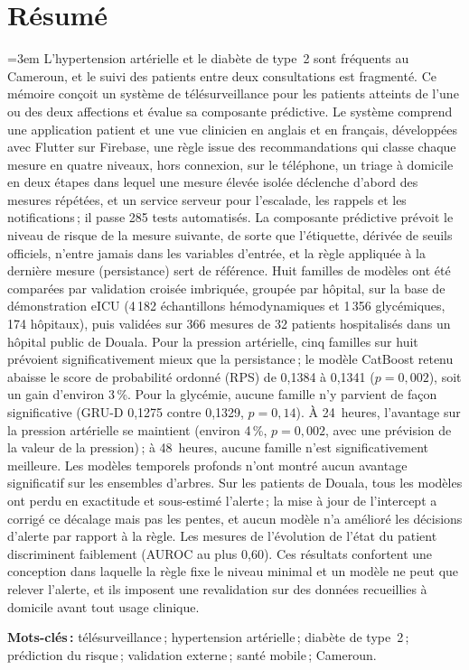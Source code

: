 \documentclass[11pt,a4paper,oneside]{report}
\begin{document}
\chapter*{Résumé}
{\emergencystretch=3em
L'hypertension artérielle et le diabète de type~2 sont fréquents au Cameroun, et le suivi des patients entre deux consultations est fragmenté. Ce mémoire conçoit un système de télésurveillance pour les patients atteints de l'une ou des deux affections et évalue sa composante prédictive. Le système comprend une application patient et une vue clinicien en anglais et en français, développées avec Flutter sur Firebase, une règle issue des recommandations qui classe chaque mesure en quatre niveaux, hors connexion, sur le téléphone, un triage à domicile en deux étapes dans lequel une mesure élevée isolée déclenche d'abord des mesures répétées, et un service serveur pour l'escalade, les rappels et les notifications\,; il passe 285 tests automatisés. La composante prédictive prévoit le niveau de risque de la mesure suivante, de sorte que l'étiquette, dérivée de seuils officiels, n'entre jamais dans les variables d'entrée, et la règle appliquée à la dernière mesure (persistance) sert de référence. Huit familles de modèles ont été comparées par validation croisée imbriquée, groupée par hôpital, sur la base de démonstration eICU (4\,182 échantillons hémodynamiques et 1\,356 glycémiques, 174 hôpitaux), puis validées sur 366 mesures de 32 patients hospitalisés dans un hôpital public de Douala. Pour la pression artérielle, cinq familles sur huit prévoient significativement mieux que la persistance\,; le modèle CatBoost retenu abaisse le score de probabilité ordonné (RPS) de 0,1384 à 0,1341 ($p = 0{,}002$), soit un gain d'environ 3\,\%. Pour la glycémie, aucune famille n'y parvient de façon significative (GRU-D 0,1275 contre 0,1329, $p = 0{,}14$). À 24~heures, l'avantage sur la pression artérielle se maintient (environ 4\,\%, $p = 0{,}002$, avec une prévision de la valeur de la pression)\,; à 48~heures, aucune famille n'est significativement meilleure. Les modèles temporels profonds n'ont montré aucun avantage significatif sur les ensembles d'arbres. Sur les patients de Douala, tous les modèles ont perdu en exactitude et sous-estimé l'alerte\,; la mise à jour de l'intercept a corrigé ce décalage mais pas les pentes, et aucun modèle n'a amélioré les décisions d'alerte par rapport à la règle. Les mesures de l'évolution de l'état du patient discriminent faiblement (AUROC au plus 0,60). Ces résultats confortent une conception dans laquelle la règle fixe le niveau minimal et un modèle ne peut que relever l'alerte, et ils imposent une revalidation sur des données recueillies à domicile avant tout usage clinique.

\medskip
\noindent\textbf{Mots-clés\,:} télésurveillance\,; hypertension artérielle\,; diabète de type~2\,; prédiction du risque\,; validation externe\,; santé mobile\,; Cameroun.\par}
\end{document}
